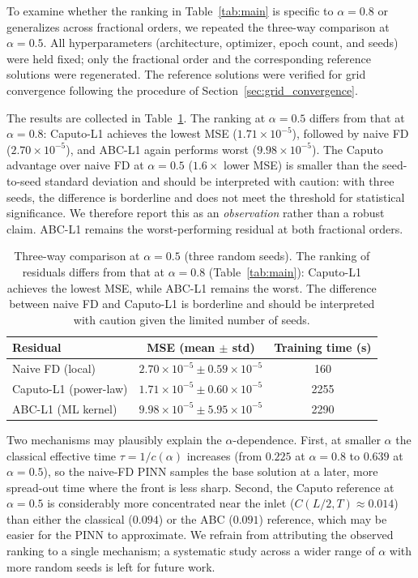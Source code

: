 \documentclass[11pt]{article}
\begin{document}
To examine whether the ranking in Table~\ref{tab:main} is specific to
\(\alpha = 0.8\) or generalizes across fractional orders, we repeated
the three-way comparison at \(\alpha = 0.5\). All hyperparameters
(architecture, optimizer, epoch count, and seeds) were held fixed; only
the fractional order and the corresponding reference solutions were
regenerated. The reference solutions were verified for grid
convergence following the procedure of
Section~\ref{sec:grid_convergence}.

The results are collected in Table~\ref{tab:alpha05}. The ranking
at \(\alpha = 0.5\) differs from that at \(\alpha = 0.8\):
Caputo-L1 achieves the lowest MSE (\(1.71\times 10^{-5}\)),
followed by naive FD (\(2.70\times 10^{-5}\)), and ABC-L1 again
performs worst (\(9.98\times 10^{-5}\)). The Caputo advantage over
naive FD at \(\alpha=0.5\) (\(1.6\times\) lower MSE) is smaller than
the seed-to-seed standard deviation and should be interpreted with
caution: with three seeds, the difference is borderline and does not
meet the threshold for statistical significance. We therefore report
this as an \emph{observation} rather than a robust claim. ABC-L1
remains the worst-performing residual at both fractional orders.

\begin{table}[h]
\centering
\caption{Three-way comparison at \(\alpha = 0.5\) (three random
         seeds). The ranking of residuals differs from that at
         \(\alpha = 0.8\) (Table~\ref{tab:main}): Caputo-L1 achieves
         the lowest MSE, while ABC-L1 remains the worst. The difference
         between naive FD and Caputo-L1 is borderline and should be
         interpreted with caution given the limited number of seeds.}
\label{tab:alpha05}
\begin{tabular}{lcc}
\toprule
Residual & MSE (mean \(\pm\) std) & Training time (s) \\
\midrule
Naive FD (local)   & \(2.70\times 10^{-5} \pm 0.59\times 10^{-5}\) & 160 \\
Caputo-L1 (power-law) & \(1.71\times 10^{-5} \pm 0.60\times 10^{-5}\) & 2255 \\
ABC-L1 (ML kernel) & \(9.98\times 10^{-5} \pm 5.95\times 10^{-5}\) & 2290 \\
\bottomrule
\end{tabular}
\end{table}

Two mechanisms may plausibly explain the \(\alpha\)-dependence. First,
at smaller \(\alpha\) the classical effective time
\(\tau = 1/c(\alpha)\) increases (from \(0.225\) at \(\alpha=0.8\) to
\(0.639\) at \(\alpha=0.5\)), so the naive-FD PINN samples the base
solution at a later, more spread-out time where the front is less
sharp. Second, the Caputo reference at \(\alpha=0.5\) is considerably
more concentrated near the inlet (\(C(L/2,T)\approx 0.014\)) than
either the classical (\(0.094\)) or the ABC (\(0.091\)) reference,
which may be easier for the PINN to approximate. We refrain from
attributing the observed ranking to a single mechanism; a systematic
study across a wider range of \(\alpha\) with more random seeds is
left for future work.
\end{document}
